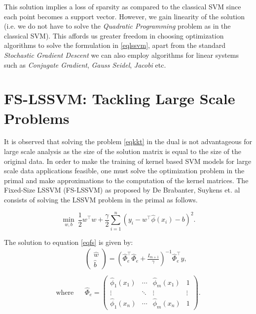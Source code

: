 This solution implies a loss of sparsity as compared to the classical SVM since each point becomes a support vector. However, we gain linearity of the solution (i.e. we do not have to solve the \textit{Quadratic Programming} problem as in the classical SVM). This affords us greater freedom in choosing optimization algorithms to solve the formulation in \eqref{eqlssvm}, apart from the standard \textit{Stochastic Gradient Descent} we can also employ algorithms for linear systems such as \textit{Conjugate Gradient}, \textit{Gauss Seidel}, \textit{Jacobi} etc.

\section{FS-LSSVM: Tackling Large Scale Problems} \label{sec:fs}
It is observed that solving the problem \eqref{eqkkt} in the dual is not advantageous for large scale analysis as the size of the solution matrix is equal to the size of the original data. In order to make the training of kernel based SVM models for large scale data applications feasible, one must solve the optimization problem in the primal and make approximations to the computation of the kernel matrices. The Fixed-Size LSSVM (FS-LSSVM) as proposed by De Brabanter, Suykens et. al \cite{DeBrabanter2010,Suykens2002} consists of solving the LSSVM problem in the primal as follows. 

\begin{equation}
\label{eqfs}
\min_{w,b} \ \frac{1}{2}w^{\intercal} w + \frac{\gamma}{2}\sum^{n}_{i=1} \left(y_{i} - w^{\intercal} \hat{\phi}(x_i) - b\right)^{2}.
\end{equation}

The solution to equation \ref{eqfs} is given by:
\begin{align}
\label{eqfssol}
& \left( \begin{matrix}
\hat{w}\\ 
\hat{b}
\end{matrix}\right ) = 
\left ( \hat{\Phi}^{\intercal}_e \hat{\Phi}_e + \frac{\mathit{I}_{m+1}}{\gamma} \right )^{-1} \hat{\Phi}^{\intercal}_e y,
\\ \nonumber \\
\text{where} \hspace{10pt}
& \hat{\Phi}_e = \begin{pmatrix}
\hat{\phi}_{1}(x_1) & \cdots & \hat{\phi}_{m}(x_1) & 1\\ 
\vdots &  \ddots & \vdots & \vdots\\ 
\hat{\phi}_{1}(x_n) & \cdots & \hat{\phi}_{m}(x_n) & 1
\end{pmatrix}. \nonumber
\end{align}


